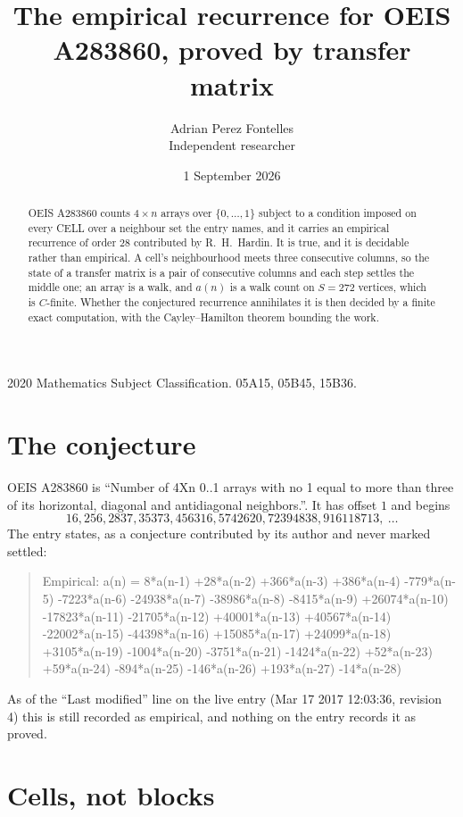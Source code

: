 \documentclass[11pt,a4paper]{article}
\title{The empirical recurrence for OEIS A283860, proved by transfer matrix}
\author{Adrian Perez Fontelles\\ \small Independent researcher}
\date{1 September 2026}
\theoremstyle{plain}
\theoremstyle{definition}
\begin{document}
\maketitle

\begin{abstract}
OEIS A283860 counts $4\times n$ arrays over $\{0,\dots,1\}$ subject to a condition imposed on
every CELL over a neighbour set the entry names, and it carries an empirical recurrence of
order $28$ contributed by R.~H.~Hardin. It is true, and it is decidable rather than
empirical. A cell's neighbourhood meets three consecutive columns, so the state of a transfer
matrix is a pair of consecutive columns and each step settles the middle one; an array is a
walk, and $a(n)$ is a walk count on $S=272$ vertices, which is $C$-finite. Whether the
conjectured recurrence annihilates it is then decided by a finite exact computation, with the
Cayley--Hamilton theorem bounding the work.
\end{abstract}

\noindent\small 2020 Mathematics Subject Classification. 05A15, 05B45, 15B36.\normalsize

\section{The conjecture}

OEIS A283860 is ``Number of 4Xn 0..1 arrays with no 1 equal to more than three of its horizontal, diagonal and antidiagonal neighbors.''. It has offset $1$ and begins
\[
16, 256, 2837, 35373, 456316, 5742620, 72394838, 916118713,\ \dots
\]
The entry states, as a conjecture contributed by its author and never marked settled:
\begin{quote}
Empirical: a(n) = 8*a(n-1) +28*a(n-2) +366*a(n-3) +386*a(n-4) -779*a(n-5) -7223*a(n-6) -24938*a(n-7) -38986*a(n-8) -8415*a(n-9) +26074*a(n-10) -17823*a(n-11) -21705*a(n-12) +40001*a(n-13) +40567*a(n-14) -22002*a(n-15) -44398*a(n-16) +15085*a(n-17) +24099*a(n-18) +3105*a(n-19) -1004*a(n-20) -3751*a(n-21) -1424*a(n-22) +52*a(n-23) +59*a(n-24) -894*a(n-25) -146*a(n-26) +193*a(n-27) -14*a(n-28)
\end{quote}
As of the ``Last modified'' line on the live entry (Mar 17 2017 12:03:36, revision 4) this is still
recorded as empirical, and nothing on the entry records it as proved.

\section{Cells, not blocks}
\end{document}
